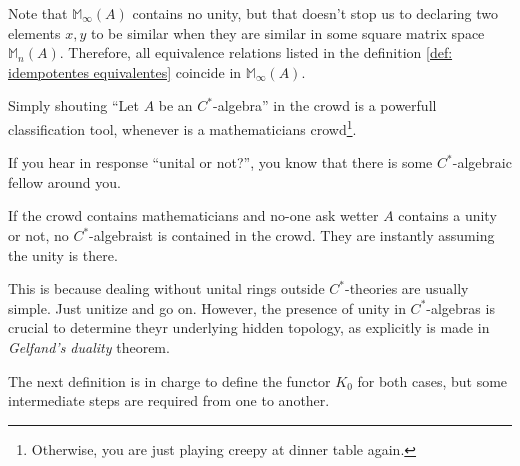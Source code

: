 \begin{observacao}
\label{obs: similar em M_inf}
Note that $\mathbb M_\infty(A)$ contains no unity, but that doesn't stop us to declaring two elements $x,y$ to be similar when they are similar in some square matrix space $\mathbb M_n(A)$. Therefore, all equivalence relations listed in the definition \ref{def: idempotentes equivalentes} coincide in $\mathbb M_\infty(A)$.
\end{observacao}

Simply shouting ``Let $A$ be an $C^*$-algebra'' in the crowd is a powerfull classification tool, whenever is a mathematicians crowd\footnote{Otherwise, you are just playing creepy at dinner table again.}. 
\begin{itroman}
    \item If you hear in response ``unital or not?'', you know that there is some $C^*$-algebraic fellow around you.
    \item If the crowd contains mathematicians and no-one ask wetter $A$ contains a unity or not, no $C^*$-algebraist is contained in the crowd. They are instantly assuming the unity is there. 
\end{itroman}

This is because dealing without unital rings outside $C^*$-theories are usually simple. Just unitize and go on. However, the presence of unity in $C^*$-algebras is crucial to determine theyr underlying hidden topology, as explicitly is made in \textit{Gelfand's duality} theorem.

The next definition is in charge to define the functor $K_0$ for both cases, but some intermediate steps are required from one to another.

